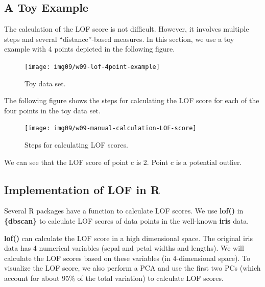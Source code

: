 \documentclass[
]{book}
\begin{document}
\hfill\break

\hypertarget{a-toy-example}{%
\subsection{A Toy Example}\label{a-toy-example}}

The calculation of the LOF score is not difficult. However, it involves multiple steps and several ``distance''-based measures. In this section, we use a toy example with 4 points depicted in the following figure.

\begin{figure}

{\centering \texttt{[image: img09/w09-lof-4point-example]} 

}

\caption{Toy data set.}\label{fig:unnamed-chunk-238}
\end{figure}

The following figure shows the steps for calculating the LOF score for each of the four points in the toy data set.

\begin{figure}

{\centering \texttt{[image: img09/w09-manual-calculation-LOF-score]} 

}

\caption{Steps for calculating LOF scores.}\label{fig:unnamed-chunk-239}
\end{figure}

We can see that the LOF score of point c is 2. Point c is a potential outlier.

\hypertarget{implementation-of-lof-in-r}{%
\subsection{Implementation of LOF in R}\label{implementation-of-lof-in-r}}

Several R packages have a function to calculate LOF scores. We use \textbf{lof()} in \textbf{\{dbscan\}} to calculate LOF scores of data points in the well-known \textbf{iris} data.

\textbf{lof()} can calculate the LOF score in a high dimensional space. The original iris data has 4 numerical variables (sepal and petal widths and lengths). We will calculate the LOF scores based on these variables (in 4-dimensional space). To visualize the LOF score, we also perform a PCA and use the first two PCs (which account for about 95\% of the total variation) to calculate LOF scores.
\end{document}
